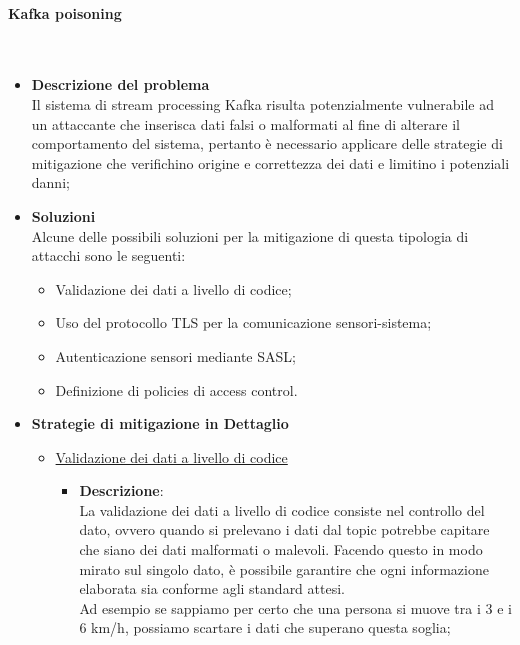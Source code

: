 \documentclass[10pt]{article}
\newcommand{\myparagraph}[1]{\paragraph{#1}\mbox{}\\}
\begin{document}
        \myparagraph{Kafka poisoning}\label{poison}
        \begin{itemize}
            \item \textbf{Descrizione del problema}\\
            Il sistema di stream processing Kafka risulta potenzialmente vulnerabile ad un attaccante che inserisca
            dati falsi o malformati al fine di alterare il comportamento del sistema, pertanto è necessario applicare delle strategie
            di mitigazione che verifichino origine e correttezza dei dati e limitino i potenziali danni;

            \item \textbf{Soluzioni}\\
            Alcune delle possibili soluzioni per la mitigazione di questa tipologia di attacchi sono le seguenti:
            \begin{itemize}
                \item Validazione dei dati a livello di codice;
                \item Uso del protocollo TLS per la comunicazione sensori-sistema;
                \item Autenticazione sensori mediante SASL;
                \item Definizione di policies di access control.
            \end{itemize}

            \item \textbf{Strategie di mitigazione in Dettaglio}
            \begin{itemize}

                \item \underline{Validazione dei dati a livello di codice}
                \begin{itemize}
                    \item \textbf{Descrizione}:\\
                    La validazione dei dati a livello di codice consiste nel controllo del dato, ovvero quando si prelevano i dati dal topic potrebbe capitare che siano dei dati malformati o malevoli.
                    Facendo questo in modo mirato sul singolo dato, è possibile garantire che ogni informazione elaborata sia conforme agli standard attesi. \\
                    Ad esempio se sappiamo per certo che una persona si muove tra i 3 e i 6 km/h, possiamo scartare i dati che superano questa soglia;


\end{itemize}
\end{itemize}
\end{itemize}
\end{document}
